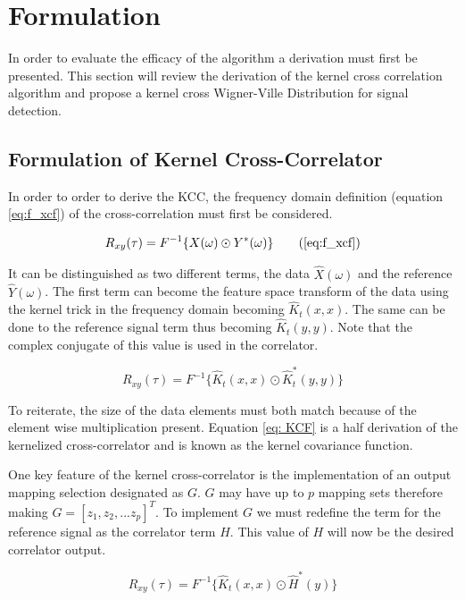     \section{Formulation}
    In order to evaluate the efficacy of the algorithm a derivation must first be presented. This section will review the derivation of the kernel cross correlation algorithm \cite{wang_kernel_2018} and propose a kernel cross Wigner-Ville Distribution for signal detection. 

    \subsection{Formulation of Kernel Cross-Correlator}
    In order to order to derive the KCC, the frequency domain definition (equation \ref*{eq:f_xcf}) of the cross-correlation must first be considered. 

    \begin{equation} 
        {R}_{xy}(\tau) = F^{-1}\{X(\omega) \odot Y^*(\omega)\} \tag{\ref*{eq:f_xcf}}
    \end{equation}
    
    It can be distinguished as two different terms, the data $\hat{X}(\omega)$ and the reference $\hat{Y}(\omega)$. The first term can become the feature space transform of the data using the kernel trick in the frequency domain becoming $\hat{K}_t(x, x)$. The same can be done to the reference signal term thus becoming $\hat{K}_t(y, y)$. Note that the complex conjugate of this value is used in the correlator.

    \begin{equation} \label{eq: KCF}
        {R}_{xy}(\tau) = F^{-1}\{ \hat{K}_t(x, x) \odot \hat{K}_t^*(y, y) \}
    \end{equation}

    To reiterate, the size of the data elements must both match because of the element wise multiplication present. Equation \ref*{eq: KCF} is a half derivation of the kernelized cross-correlator and is known as the kernel covariance function. 
    
    One key feature of the kernel cross-correlator is the implementation of an output mapping selection designated as ${G}$. $G$ may have up to $p$ mapping sets therefore making $G = [z_1, z_2, ... z_p]^T$. To implement $G$ we must redefine the term for the reference signal as the correlator term $H$. This value of $H$ will now be the desired correlator output. 

     \begin{equation} \label{eq:KCC_final}
         {R}_{xy}(\tau) = F^{-1}\{ \hat{K}_t(x, x) \odot \hat{H}^*(y) \}
     \end{equation}

